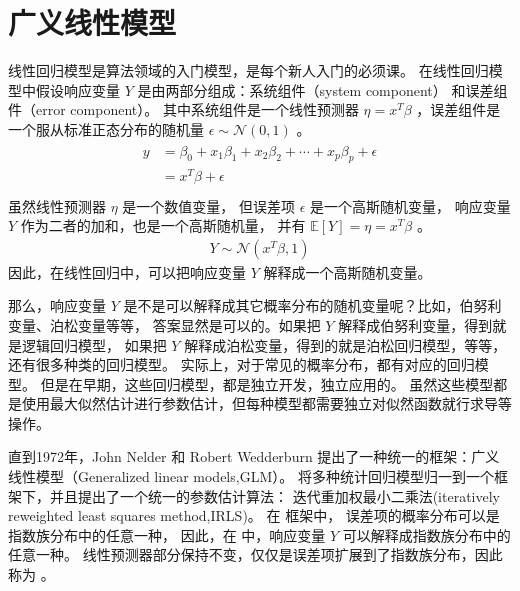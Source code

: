 \documentclass[letterpaper,10pt,english]{sphinxmanual}
\begin{document}
\chapter{广义线性模型}
\label{\detokenize{_u5e7f_u4e49_u7ebf_u6027_u6a21_u578b/content:id1}}\label{\detokenize{_u5e7f_u4e49_u7ebf_u6027_u6a21_u578b/content::doc}}
线性回归模型是算法领域的入门模型，是每个新人入门的必须课。
在线性回归模型中假设响应变量 \(Y\) 是由两部分组成：系统组件（system component）
和误差组件（error component）。
其中系统组件是一个线性预测器 \(\eta=x^T \beta\)
，误差组件是一个服从标准正态分布的随机量 \(\epsilon \sim \mathcal{N}(0,1)\)
。
\begin{align}\label{equation:广义线性模型/content:广义线性模型/content:0}\!\begin{aligned}
y &= \beta_0 + x_1 \beta_1 +x_2 \beta_2 +\cdots + x_p \beta_p  + \epsilon\\
&= x^T \beta + \epsilon\\
\end{aligned}\end{align}
虽然线性预测器 \(\eta\) 是一个数值变量，
但误差项 \(\epsilon\) 是一个高斯随机变量，
响应变量 \(Y\) 作为二者的加和，也是一个高斯随机量，
并有 \(\mathbb{E}[Y]=\eta=x^T \beta\)
。
\begin{equation}\label{equation:广义线性模型/content:广义线性模型/content:1}
\begin{split}Y \sim  \mathcal{N}(x^T \beta,1)\end{split}
\end{equation}
因此，在线性回归中，可以把响应变量 \(Y\) 解释成一个高斯随机变量。

那么，响应变量 \(Y\) 是不是可以解释成其它概率分布的随机变量呢？比如，伯努利变量、泊松变量等等，
答案显然是可以的。如果把 \(Y\) 解释成伯努利变量，得到就是逻辑回归模型，
如果把 \(Y\) 解释成泊松变量，得到的就是泊松回归模型，等等，还有很多种类的回归模型。
实际上，对于常见的概率分布，都有对应的回归模型。
但是在早期，这些回归模型，都是独立开发，独立应用的。
虽然这些模型都是使用最大似然估计进行参数估计，但每种模型都需要独立对似然函数就行求导等操作。

直到1972年，John Nelder 和 Robert Wedderburn
提出了一种统一的框架：广义线性模型（Generalized linear models,GLM）。
 将多种统计回归模型归一到一个框架下，并且提出了一个统一的参数估计算法：
迭代重加权最小二乘法(iteratively reweighted least squares method,IRLS)。
在  框架中，
误差项的概率分布可以是指数族分布中的任意一种，
因此，在  中，响应变量 \(Y\) 可以解释成指数族分布中的任意一种。
线性预测器部分保持不变，仅仅是误差项扩展到了指数族分布，因此称为
 。
\end{document}
